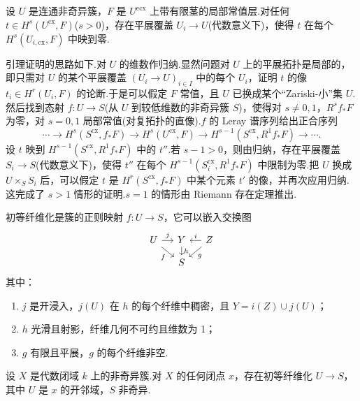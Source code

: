 \begin{lemma}\label{lem:21.6}
设 $U$ 是连通非奇异簇，$F$ 是 $U^{\mathrm{ecx}}$ 上带有限茎的局部常值层.对任何 $t \in H^{s}(U^{\mathrm{cx}}, F)$($s > 0$)，存在平展覆盖 $U_i \to U$(代数意义下)，使得 $t$ 在每个 $H^{s}(U_{i,\mathrm{cx}}, F)$ 中映到零.
\end{lemma}

引理证明的思路如下.对 $U$ 的维数作归纳.显然问题对 $U$ 上的平展拓扑是局部的，即只需对 $U$ 的某个平展覆盖 $(U_i \to U)_{i \in I}$ 中的每个 $U_i$，证明 $t$ 的像 $t_i \in H^{r}(U_i, F)$ 的论断.于是可以假定 $F$ 常值，且 $U$ 已换成某个``Zariski-小''集 $U$.然后找到态射 $f \colon U \to S$(从 $U$ 到较低维数的非奇异簇 $S$)，使得对 $s \neq 0, 1$，$R^{s}f_{*}F$ 为零，对 $s = 0, 1$ 局部常值(对复拓扑的直像).$f$ 的 Leray 谱序列给出正合序列
\[
\cdots \to H^{s}(S^{\mathrm{cx}}, f_{*}F) \to H^{s}(U^{\mathrm{cx}}, F) \to H^{s-1}(S^{\mathrm{cx}}, R^{1}f_{*}F) \to \cdots.
\]
设 $t$ 映到 $H^{s-1}(S^{\mathrm{cx}}, R^{1}f_{*}F)$ 中的 $t''$.若 $s - 1 > 0$，则由归纳，存在平展覆盖 $S_i \to S$(代数意义下)，使得 $t''$ 在每个 $H^{s-1}(S^{\mathrm{cx}}_i, R^{1}f_{*}F)$ 中限制为零.把 $U$ 换成 $U \times_{S} S_i$ 后，可以假定 $t$ 是 $H^{r}(S^{\mathrm{cx}}, f_{*}F)$ 中某个元素 $t'$ 的像，并再次应用归纳.这完成了 $s > 1$ 情形的证明.$s = 1$ 的情形由 Riemann 存在定理推出.

\begin{definition}\label{def:21.7}
初等纤维化是簇的正则映射 $f \colon U \to S$，它可以嵌入交换图
\[
\begin{tikzcd}[row sep=small, column sep=small]
U \arrow[r, "j"] \arrow[rd, "f"'] & Y \arrow[d, "h"] & Z \arrow[l, "i"'] \arrow[ld, "g"] \\
& S &
\end{tikzcd}
\]
其中：
\begin{enumerate}
  \item $j$ 是开浸入，$j(U)$ 在 $h$ 的每个纤维中稠密，且 $Y = i(Z) \cup j(U)$；
  \item $h$ 光滑且射影，纤维几何不可约且维数为 1；
  \item $g$ 有限且平展，$g$ 的每个纤维非空.
\end{enumerate}
\end{definition}

\begin{proposition}\label{prop:21.8}
设 $X$ 是代数闭域 $k$ 上的非奇异簇.对 $X$ 的任何闭点 $x$，存在初等纤维化 $U \to S$，其中 $U$ 是 $x$ 的开邻域，$S$ 非奇异.
\end{proposition}

